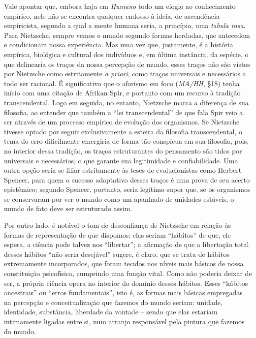 \documentclass[
	12pt,				%
	openright,			%
	oneside,			%
	a4paper,			%
	english,			%
	french,				%
	spanish,			%
	brazil				%
	]{abntex2}
\begin{document}
Vale apontar que, embora haja em \textit{Humano} todo um elogio ao conhecimento empírico, nele não se encontra qualquer endosso à ideia, de ascendência empiricista, segundo a qual a mente humana seria, a princípio, uma \textit{tabula rasa}. Para Nietzsche, sempre vemos o mundo segundo formas herdadas, que antecedem e condicionam nossa experiência. Mas uma vez que, justamente, é a história empírica, biológica e cultural dos indivíduos e, em última instância, da espécie, o que delinearia os traços da nossa percepção de mundo, esses traços não são vistos por Nietzsche como estritamente \textit{a priori}, como traços universais e necessários a todo ser racional. É significativo que o aforismo em foco (\textit{MA/HH}, §18) tenha início com uma citação de Afrikan Spir, e portanto com um recurso à tradição transcendental. Logo em seguida, no entanto, Nietzsche marca a diferença de sua filosofia, ao entender que também a “lei transcendental” de que fala Spir veio a ser através de um processo empírico de evolução dos organismos. Se Nietzsche tivesse optado por seguir exclusivamente a esteira da filosofia transcendental, o tema do erro dificilmente emergiria de forma tão conspícua em sua filosofia, pois, no interior dessa tradição, os traços estruturantes do pensamento são tidos por universais e necessários, o que garante sua legitimidade e confiabilidade. Uma outra opção seria se filiar estritamente às teses de evolucionistas como Herbert Spencer, para quem o sucesso adaptativo desses traços é uma prova de seu acerto epistêmico; segundo Spencer, portanto, seria legítimo supor que, se os organismos se conservaram por ver o mundo como um apanhado de unidades estáveis, o mundo de fato deve ser estruturado assim. 

Por outro lado, é notável o tom de desconfiança de Nietzsche em relação às formas de representação de que dispomos: elas seriam “hábitos” de que, ele espera, a ciência pode talvez nos “libertar”; a afirmação de que a libertação total desses hábitos “não seria desejável” sugere, é claro, que se trata de hábitos extremamente incorporados, que foram tecidos nos níveis mais básicos de nossa constituição psicofísica, cumprindo uma função vital. Como não poderia deixar de ser, a própria ciência opera no interior do domínio desses hábitos. Esses “hábitos ancestrais” ou “erros fundamentais”, isto é, as formas mais básicas empregadas na percepção e conceitualização que fazemos do mundo seriam: unidade, identidade, substância, liberdade da vontade – sendo que elas estariam intimamente ligadas entre si, num arranjo responsável pela pintura que fazemos do mundo. 
\end{document}
